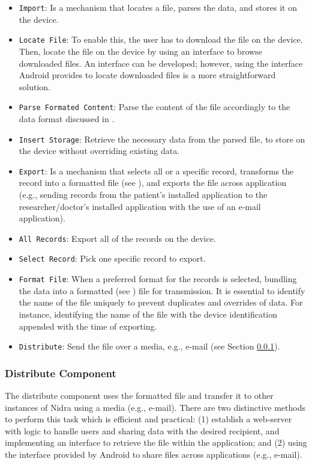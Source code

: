 \begin{itemize}
    \item[2.1] \verb|Import|: Is a mechanism that locates a file, parses the data, and stores it on the device.
    \item[2.1.1] \verb|Locate File|: To enable this, the user has to download the file on the device. Then, locate the file on the device by using an interface to browse downloaded files. An interface can be developed; however, using the interface Android provides to locate downloaded files is a more straightforward solution.
    \item[2.1.2] \verb|Parse Formated Content|: Parse the content of the file accordingly to the data format discussed in .
    \item[2.1.3] \verb|Insert Storage|: Retrieve the necessary data from the parsed file, to store on the device without overriding existing data.   
    \item[2.2] \verb|Export|: Is a mechanism that selects all or a specific record, transforms the record into a formatted file (see ), and exports the file across application (e.g., sending records from the patient's installed application to the researcher/doctor's installed application with the use of an e-mail application). 
    \item[2.2.1.1] \verb|All Records|: Export all of the records on the device.
    \item[2.2.1.2] \verb|Select Record|: Pick one specific record to export. 
    \item[2.2.2] \verb|Format File|: When a preferred format for the records is selected, bundling the data into a formatted (see ) file for transmission. It is essential to identify the name of the file uniquely to prevent duplicates and overrides of data. For instance, identifying the name of the file with the device identification appended with the time of exporting. 
    \item[2.2.3] \verb|Distribute|: Send the file over a media, e.g., e-mail (see Section \ref{des:distro}).
\end{itemize}

\subsubsection{Distribute Component}\label{des:distro}
The distribute component uses the formatted file and transfer it to other instances of Nidra using a media (e.g., e-mail). There are two distinctive methods to perform this task which is efficient and practical: (1) establish a web-server with logic to handle users and sharing data with the desired recipient, and implementing an interface to retrieve the file within the application; and (2) using the interface provided by Android to share files across applications (e.g., e-mail). 

